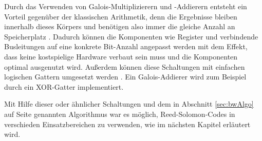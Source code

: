 Durch das Verwenden von Galois-Multiplizierern und -Addierern entsteht ein Vorteil gegenüber der klassischen Arithmetik, denn die Ergebnisse bleiben innerhalb dieses Körpers und benötigen also immer die gleiche Anzahl an Speicherplatz \cite[Kapitel 3]{weitzKonkreteMathematikNicht2021}.
Dadurch können die Komponenten wie Register und verbindende Busleitungen auf eine konkrete Bit-Anzahl angepasst werden mit dem Effekt, dass keine kostspielige Hardware verbaut sein muss und die Komponenten optimal ausgenutzt wird.
Außerdem können diese Schaltungen mit einfachen logischen Gattern umgesetzt werden \cite{biernatHardwareImplementationReedSolomon2010, southwellIntroductionErrorDetection}.
Ein Galois-Addierer wird zum Beispiel durch ein XOR-Gatter implementiert.

Mit Hilfe dieser oder ähnlicher Schaltungen und dem in Abschnitt \ref{sec:bwAlgo} auf Seite \pageref{sec:bwAlgo} genannten Algorithmus war es möglich, Reed-Solomon-Codes in verschieden Einsatzbereichen zu verwenden, wie im nächsten Kapitel erläutert wird.